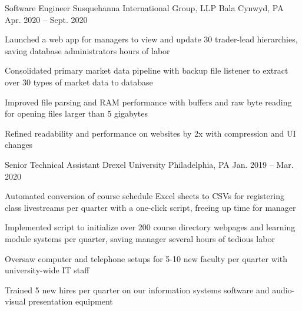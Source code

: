 

\begin{cventries}

  \cventry
  {Software Engineer} %
  {Susquehanna International Group, LLP} %
  {Bala Cynwyd, PA} %
  {Apr. 2020 -- Sept. 2020} %
  {
    \begin{cvitems} %
      \item {Launched a web app for managers to view and update 30 trader-lead hierarchies, saving database administrators hours of labor}
      \item {Consolidated primary market data pipeline with backup file listener to extract over 30 types of market data to database}
      \item {Improved file parsing and RAM performance with buffers and raw byte reading for opening files larger than 5 gigabytes}
      \item {Refined readability and performance on websites by 2x with compression and UI changes}
    \end{cvitems}
  }

  \cventry
  {Senior Technical Assistant} %
  {Drexel University} %
  {Philadelphia, PA} %
  {Jan. 2019 -- Mar. 2020} %
  {
    \begin{cvitems} %
      \item {Automated conversion of course schedule Excel sheets to CSVs for registering class livestreams per quarter with a one-click script, freeing up time for manager}
      \item {Implemented script to initialize over 200 course directory webpages and learning module systems per quarter, saving manager several hours of tedious labor}
      \item {Oversaw computer and telephone setups for 5-10 new faculty per quarter with university-wide IT staff}
      \item {Trained 5 new hires per quarter on our information systems software and audio-visual presentation equipment}
    \end{cvitems}
  }

\end{cventries}

